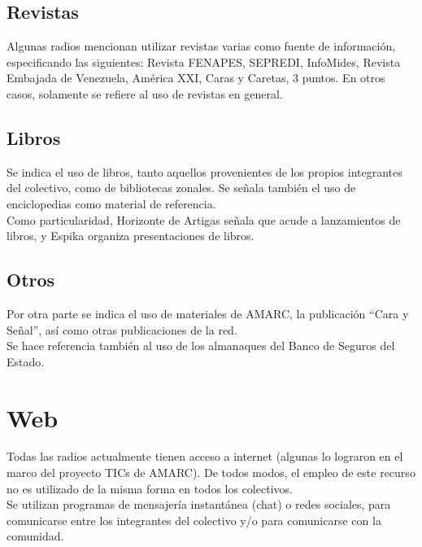 \subsection{Revistas}

Algunas radios mencionan utilizar revistas varias como fuente de información, especificando las siguientes: Revista FENAPES, SEPREDI, InfoMides, Revista Embajada de Venezuela, América XXI, Caras y Caretas, 3 puntos. En otros casos, solamente se refiere al uso de revistas en general.\\

\subsection{Libros}

Se indica el uso de libros, tanto aquellos provenientes de los propios integrantes del colectivo, como de bibliotecas zonales. Se señala también el uso de enciclopedias como material de referencia.\\

Como particularidad, Horizonte de Artigas señala que acude a lanzamientos de libros, y Espika organiza presentaciones de libros.\\

\subsection{Otros}

Por otra parte se indica el uso de materiales de AMARC, la publicación ``Cara y Señal'', así como otras publicaciones de la red.\\

Se hace referencia también al uso de los almanaques del Banco de Seguros del Estado.\\

\section{Web\label{web}}

Todas las radios actualmente tienen acceso a internet (algunas lo lograron en el marco del proyecto TICs de AMARC). De todos modos, el empleo de este recurso no es utilizado de la misma forma en todos los colectivos.\\

Se utilizan programas de mensajería instantánea (chat) o redes sociales, para comunicarse entre los integrantes del colectivo y/o para comunicarse con la comunidad.\\


